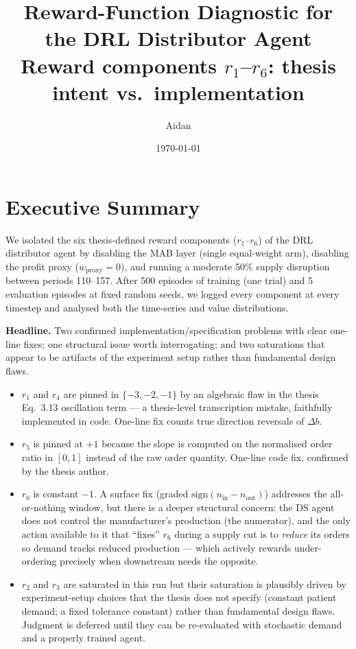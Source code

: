 \documentclass[11pt,letterpaper]{article}
\title{Reward-Function Diagnostic for the DRL Distributor Agent\\
\large Reward components $r_1$--$r_6$: thesis intent vs.\ implementation}
\author{Aidan}
\date{\today}
\begin{document}
\maketitle

\section*{Executive Summary}

We isolated the six thesis-defined reward components ($r_1$--$r_6$) of the DRL distributor agent by disabling the MAB layer (single equal-weight arm), disabling the profit proxy ($w_{\text{proxy}} = 0$), and running a moderate 50\% supply disruption between periods 110--157.  After 500 episodes of training (one trial) and 5 evaluation episodes at fixed random seeds, we logged every component at every timestep and analysed both the time-series and value distributions.

\textbf{Headline.}  Two confirmed implementation/specification problems with clear one-line fixes; one structural issue worth interrogating; and two saturations that appear to be artifacts of the experiment setup rather than fundamental design flaws.
\begin{itemize}
  \item $r_1$ and $r_4$ are pinned in $\{-3,-2,-1\}$ by an algebraic flaw in the thesis Eq.~3.13 oscillation term --- a thesis-level transcription mistake, faithfully implemented in code.  One-line fix counts true direction reversals of $\Delta b$.
  \item $r_5$ is pinned at $+1$ because the slope is computed on the normalised order ratio in $[0,1]$ instead of the raw order quantity.  One-line code fix, confirmed by the thesis author.
  \item $r_6$ is constant $-1$.  A surface fix (graded $\mathrm{sign}(n_{\text{in}}-n_{\text{out}})$) addresses the all-or-nothing window, but there is a deeper structural concern: the DS agent does not control the manufacturer's production (the numerator), and the only action available to it that ``fixes'' $r_6$ during a supply cut is to \emph{reduce} its orders so demand tracks reduced production --- which actively rewards under-ordering precisely when downstream needs the opposite.
  \item $r_2$ and $r_3$ are saturated in this run but their saturation is plausibly driven by experiment-setup choices that the thesis does not specify (constant patient demand; a fixed tolerance constant) rather than fundamental design flaws.  Judgment is deferred until they can be re-evaluated with stochastic demand and a properly trained agent.
\end{itemize}
\end{document}
